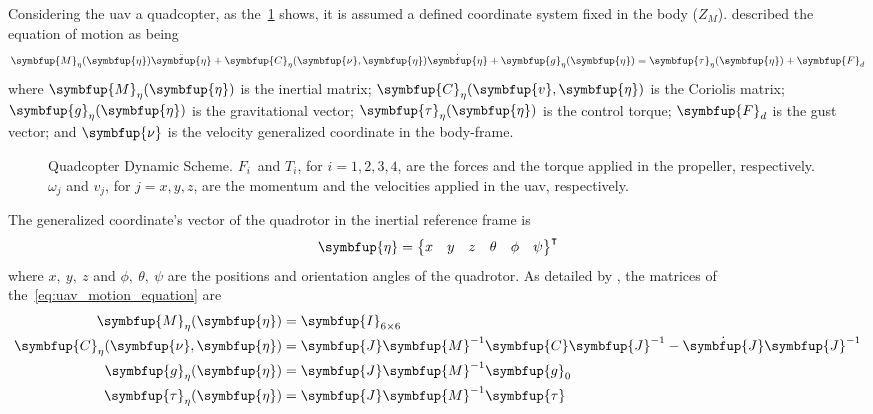Considering the \gls*{uav} a quadcopter, as the~\cref{fig:quadcopter_forces_scheme} shows, it is assumed a defined coordinate system fixed in the body (\(Z_M\)). \citet{fossen1994} described the equation of motion as being
%
\begin{equation}
    \symbfup{M}_{\eta}(\symbfup{\eta})\ddot{\symbfup{\eta}} +
    \symbfup{C}_{\eta}(\symbfup{\nu},\symbfup{\eta})\dot{\symbfup{\eta}} +
    \symbfup{g}_{\eta}(\symbfup{\eta}) =
    \symbfup{\tau}_{\eta}(\symbfup{\eta}) + 
    \symbfup{F}_d
    \label{eq:uav_motion_equation}
\end{equation}
%
where \(\symbfup{M}_{\eta}(\symbfup{\eta})\) is the inertial matrix; \(\symbfup{C}_{\eta}(\symbfup{v},\symbfup{\eta})\) is the Coriolis matrix; \(\symbfup{g}_{\eta}(\symbfup{\eta})\) is the gravitational vector; \(\symbfup{\tau}_{\eta}(\symbfup{\eta})\) is the control torque; \(\symbfup{F}_d\) is the gust vector; and \(\symbfup{\nu}\) is the velocity generalized coordinate in the body-frame.
%
\begin{figure}[!htb]
    \centering
    
    \caption[Quadcopter Dynamic Scheme]{Quadcopter Dynamic Scheme. \(F_i\,\) and \(T_i\), for \(i=1,2,3,4\), are the forces and the torque applied in the propeller, respectively. \(\omega_j\) and \(v_j\), for \(j=x,y,z\), are the momentum and the velocities applied in the \gls*{uav}, respectively.}
    \label{fig:quadcopter_forces_scheme}
\end{figure}
%
The generalized coordinate's vector of the quadrotor in the inertial reference frame is
%
\begin{equation}
    \symbfup{\eta} = \begin{Bmatrix}
        x & y & z & \theta & \phi & \psi
    \end{Bmatrix}^{\intercal}
\end{equation}
%
where \(x,\ y,\ z\) and \(\phi,\ \theta,\ \psi\) are the positions and orientation angles of the quadrotor.
As detailed by \citet{geronel2023}, the matrices of the~\cref{eq:uav_motion_equation} are
%
\begin{align}
    \symbfup{M}_{\eta}(\symbfup{\eta}) &= \symbfup{I}_{6\times6} \\
    \symbfup{C}_{\eta}(\symbfup{\nu},\symbfup{\eta}) &= \symbfup{J}\symbfup{M}^{-1}\symbfup{C}\symbfup{J}^{-1} - \dot{\symbfup{J}}\symbfup{J}^{-1} \\
    \symbfup{g}_{\eta}(\symbfup{\eta}) &= \symbfup{J}\symbfup{M}^{-1}\symbfup{g}_{0} \\
    \symbfup{\tau}_{\eta}(\symbfup{\eta}) &= \symbfup{J}\symbfup{M}^{-1}\symbfup{\tau}
    \label{eq:matrices_dynamic}
\end{align}
